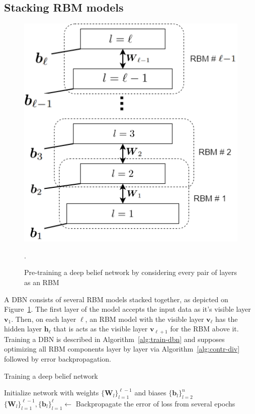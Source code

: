 \subsection{Stacking RBM models}
\begin{figure}
	\includegraphics[height=0.4\textwidth,keepaspectratio]{img/dbn.png}
	\centering
	\caption{Pre-training a deep belief network by considering every pair of layers as an RBM \cite{Ghojogh.2021}}.
	\label{fig:dbn}
\end{figure}
A DBN consists of several RBM models stacked together, as depicted on
Figure~\ref{fig:dbn}. The first layer of the model accepts the input data as
it's visible layer $\mathbf{v}_1$. Then, on each layer $\ell$, an RBM model with
the visible layer $\mathbf{v}_\ell$ has the hidden layer $\mathbf{h}_\ell$ that
is acts as the visible layer $\mathbf{v}_{\ell+1}$ for the RBM above it.
Training a DBN is described in Algorithm~\ref{alg:train-dbn} and supposes
optimizing all RBM components layer by layer via Algorithm~\ref{alg:contr-div}
followed by error backpropagation.

\begin{algorithm}[b!]
	\caption {Training a deep belief network}
	Initialize network with weights $\{\mathbf{W}_l\}_{l=1}^{\ell-1}$
	and biases $\{\mathbf{b}_l\}_{l=2}^n$\;
	$\{\mathbf{W}_l\}_{l=1}^{\ell-1},\{\mathbf{b}_l\}_{l=1}^\ell\gets$
	Backpropagate the error of loss from several epochs
	\label{alg:train-dbn}
\end{algorithm}


